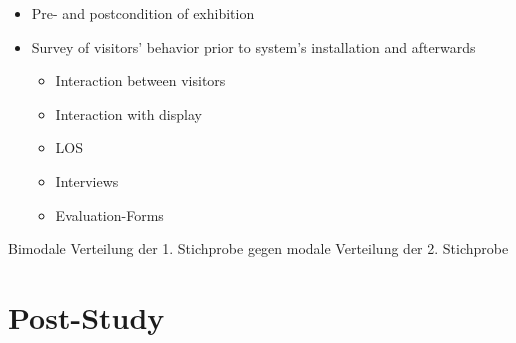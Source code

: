 \begin{itemize}
	\item Pre- and postcondition of exhibition
	\item Survey of visitors' behavior prior to system's installation and afterwards
	\begin{itemize}
		\item Interaction between visitors
		\item Interaction with display
		\item \ac{LOS}
		\item Interviews
		\item Evaluation-Forms
	\end{itemize}
\end{itemize}

Bimodale Verteilung der 1. Stichprobe gegen modale Verteilung der 2. Stichprobe


\section{Post-Study}
\label{evaluation_post}
